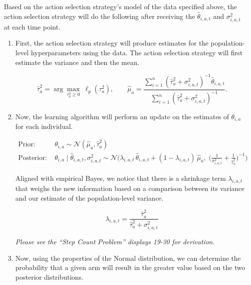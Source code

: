 \documentclass[letterpaper, 11pt]{extarticle}
\begin{document}
Based on the action selection strategy's model of the data specified above, the action selection strategy will do the following after receiving the $\hat{\theta}_{i,a,t}$ and $\sigma^2_{i,a,t}$ at each time point.

\begin{enumerate}
    \item First, the action selection strategy will produce estimates for the population-level hyperparameters using the data. The action selection strategy will first estimate the variance and then the mean. 

    \[
    \hat{\tau}_a^{2} 
    = 
    \arg\max_{\tau_a^{2} \ge 0} \; \ell_{p}(\tau_a^{2}),
    \qquad
    \hat{\mu}_a
    =
    \frac{
        \displaystyle\sum_{i=1}^{n}
        \left( \hat{\tau}_a^{2} + \sigma^2_{i,a,t} \right)^{-1}
        \hat{\theta}_{i,a,t}
    }{
        \displaystyle\sum_{i=1}^{n}
        \left( \hat{\tau}_a^{2} + \sigma^2_{i,a,t} \right)^{-1}
    }.
    \]

    \item Now, the learning algorithm will perform an update on the estimates of $\theta_{i,a}$ for each individual. 
    
    \begin{align*}
    \text{Prior: } 
    &\theta_{i,a} \sim \mathcal{N}(\hat{\mu}_a, \hat{\tau}_a^{2})\\
    \text{Posterior: } 
    &\theta_{i,a} \mid \hat{\theta}_{i,a,t}, \sigma^2_{i,a,t}
    \sim
    \mathcal{N}\!\Bigg(
        \lambda_{i,a,t} \, \hat{\theta}_{i,a,t}
        + (1 - \lambda_{i,a,t}) \, \hat{\mu}_a,
        \;
        \Bigg(
            \frac{1}{\sigma^2_{i,a,t}}
            +
            \frac{1}{\hat{\tau}_a^{2}}
        \Bigg)^{-1}
    \Bigg)
    \end{align*}

    Aligned with empirical Bayes, we notice that there is a shrinkage term $\lambda_{i,a,t}$ that weighs the new information based on a comparison between its variance and our estimate of the population-level variance.

    \[
    \lambda_{i,a,t}
    =
    \frac{\hat{\tau}_a^{2}}
    {\hat{\tau}_a^{2} + \sigma^2_{i,a,t}}
    \]

    \textit{Please see the \enquote{Step Count Problem} displays 19-30 for derivation.}

    \item Now, using the properties of the Normal distribution, we can determine the probability that a given arm will result in the greater value based on the two posterior distributions. 


\end{enumerate}
\end{document}
